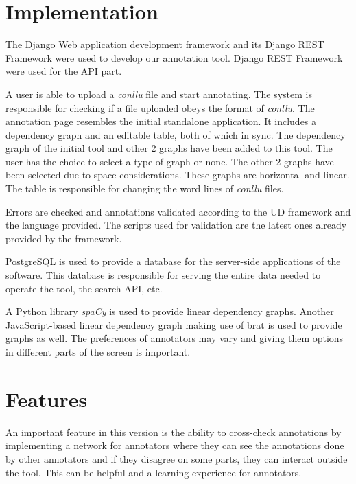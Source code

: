 \documentclass[
]{ceurart}
\begin{document}
\section{Implementation}
\label{sec:implementation}

The Django\cite{django} Web application development framework and its Django REST Framework\cite{drf} were used to develop our annotation tool.
Django REST Framework were used for the API part.

A user is able to upload a \textit{conllu} file and start annotating.
The system is responsible for checking if a file uploaded obeys the format of \textit{conllu}.
The annotation page resembles the initial standalone application.
It includes a dependency graph and an editable table, both of which in sync.
The dependency graph of the initial tool and other 2 graphs have been added to this tool.
The user has the choice to select a type of graph or none.
The other 2 graphs have been selected due to space considerations.
These graphs are horizontal and linear.
The table is responsible for changing the word lines of \textit{conllu} files.

Errors are checked and annotations validated according to the UD framework and the language provided.
The scripts used for validation are the latest ones already provided by the framework.\cite{UD-git}

PostgreSQL\cite{psql} is used to provide a database for the server-side applications of the software.
This database is responsible for serving the entire data needed to operate the tool, the search API, etc.

A Python library \textit{spaCy}\cite{spacy} is used to provide linear dependency graphs.
Another JavaScript-based linear dependency graph\cite{spyssalo} making use of brat\cite{brat-vis} is used to provide graphs as well.
The preferences of annotators may vary and giving them options in different parts of the screen is important.


\section{Features}
\label{sec:features}

An important feature in this version is the ability to cross-check annotations by implementing a network for annotators where they can see the annotations done by other annotators and if they disagree on some parts, they can interact outside the tool.
This can be helpful and a learning experience for annotators.
\end{document}

